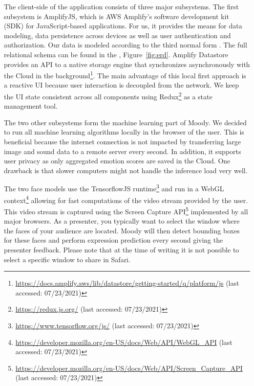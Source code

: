 The client-side of the application consists of three major subsystems. The first subsystem is AmplifyJS, which is AWS Amplify's software development kit (SDK) for JavaScript-based applications. For us, it provides the means for data modeling, data persistence across devices as well as user authentication and authorization. Our data is modeled according to the third normal form \cite{codd_further_1972}. The full relational schema can be found in the , Figure~\ref{fig:erd}. Amplify Datastore provides an API to a native storage engine that synchronizes asynchronously with the Cloud in the background\footnote{\url{https://docs.amplify.aws/lib/datastore/getting-started/q/platform/js} (last accessed: 07/23/2021)}. The main advantage of this local first approach is a reactive UI because user interaction is decoupled from the network. We keep the UI state consistent across all components using Redux\footnote{\url{https://redux.js.org/} (last accessed: 07/23/2021)} as a state management tool.

The two other subsystems form the machine learning part of Moody. We decided to run all machine learning algorithms locally in the browser of the user. This is beneficial because the internet connection is not impacted by transferring large image and sound data to a remote server every second. In addition, it supports user privacy as only aggregated emotion scores are saved in the Cloud. One drawback is that slower computers might not handle the inference load very well.

The two face models use the TensorflowJS runtime\footnote{\url{https://www.tensorflow.org/js/} (last accessed: 07/23/2021)} and run in a WebGL context\footnote{\url{https://developer.mozilla.org/en-US/docs/Web/API/WebGL_API} (last accessed: 07/23/2021)} allowing for fast computations of the video stream provided by the user. This video stream is captured using the Screen Capture API\footnote{\url{https://developer.mozilla.org/en-US/docs/Web/API/Screen_Capture_API} (last accessed: 07/23/2021)} implemented by all major browsers. As a presenter, you typically want to select the window where the faces of your audience are located. Moody will then detect bounding boxes for these faces and perform expression prediction every second giving the presenter feedback. Please note that at the time of writing it is not possible to select a specific window to share in Safari.

